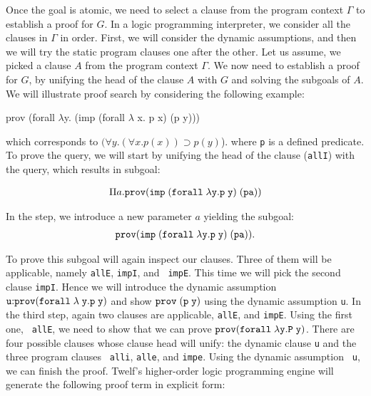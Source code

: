 \documentclass{llncs}
\newcommand{\figfoot}{\vspace{1ex}\hrule}
\newcommand{\pfLF}{{\tt{prov}}}
\newcommand{\impLF}{\tt{imp}\;}
\newcommand{\forallLF}{\tt{forall}\;}
\newcommand{\impl}{\supset}
\begin{document}

Once the goal is atomic, we need to select a clause from the
program context $\Gamma$ to establish a proof for $G$. In a logic
programming interpreter, we consider all the clauses in $\Gamma$ in order. 
First, we will consider the dynamic assumptions, and then we will try
the static program clauses one after the other. 
Let us assume, we picked a clause $A$ from the program context
$\Gamma$. We now need to establish a proof for $G$, by unifying the
head of the clause $A$ with $G$ and solving the subgoals of $A$.
We will illustrate proof search by considering the following example:  

\begin{code}
prov (forall $\lambda$y. (imp (forall $\lambda$ x. p x) (p y)))  
\end{code}

which corresponds to $(\forall y. (\forall x.p(x)) \impl p(y)$).  
where {\tt p} is a defined predicate. To prove the query, we will
start by unifying the head of the clause ({\tt allI}) with the
query, which results in subgoal:  

\[
\begin{array}{c}
\Pi a. \pfLF ( \impLF (\forallLF \lambda y. p\; y)\; (p a))
\end{array}
\]

In the {} step, we introduce a new parameter $a$
yielding the subgoal:
\[
\begin{array}{c}
\pfLF ( \impLF (\forallLF \lambda y. p\; y)\; (p a)).
\end{array}
\]

To prove this subgoal will again inspect our clauses. Three of them
will be applicable, namely {\tt allE}, {\tt impI}, and {\tt
  impE}. This time we will pick the second clause {\tt impI}. Hence we
will introduce the dynamic assumption ${\tt{u}} {:} \pfLF (\forallLF
\lambda \;y. p\; y)$ and show $\pfLF\; {\tt (p\; y)}$ using the dynamic
assumption {\tt{u}}. In the third step, again two clauses are
applicable,  {\tt allE}, and {\tt impE}. Using the first one, {\tt
  allE}, we need to show that we can prove $\pfLF (\forallLF \lambda
y. P\; y)$. There are four possible clauses whose clause head will
unify: the dynamic clause {\tt u} and the three program clauses {\tt
  alli}, {\tt alle}, and {\tt impe}. Using the dynamic assumption {\tt
  u}, we can finish the proof. Twelf's
higher-order logic programming engine will generate the following
proof term in explicit form:  
\end{document}
